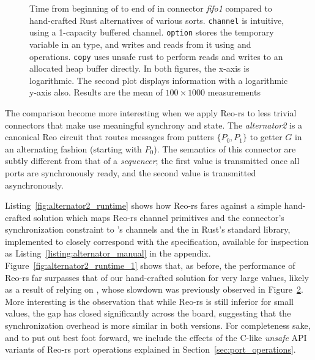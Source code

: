 \begin{figure}
{\begin{subfigure}[b]{0.63\textwidth}
			\caption{}
			\label{fig:exper_rtt_1}
		\end{subfigure}%
	}
	\caption[Performance of fifo1 connector vs.\ hand-crafted Rust code.]{Time from beginning of  to end of  in connector \textit{fifo1} compared to hand-crafted Rust alternatives of various sorts. \texttt{channel} is intuitive, using a  1-capacity buffered channel. \texttt{option} stores the temporary variable in an  type, and writes and reads from it using  and  operations. \texttt{copy} uses unsafe rust to perform reads and writes to an allocated heap buffer directly. In both figures, the x-axis is logarithmic. The second plot displays information with a logarithmic y-axis also. Results are the mean of $100\times{}1000$ measurements}
	\label{fig:exper_rtt}
\end{figure}

The comparison become more interesting when we apply Reo-rs to less trivial connectors that make use meaningful synchrony and state. The \textit{alternator2} is a canonical Reo circuit that routes messages from putters $\{P_0, P_1\}$ to getter $G$ in an alternating fashion (starting with $P_0$). The semantics of this connector are subtly different from that of a \textit{sequencer}; the first value is transmitted once all ports are synchronously ready, and the second value is transmitted asynchronously.

Listing~\ref{fig:alternator2_runtime} shows how Reo-rs fares against a simple hand-crafted solution which maps Reo-rs channel primitives and the connector's synchronization constraint to 's channels and the  in Rust's standard library, implemented to closely correspond with the specification, available for inspection as Listing~\ref{listing:alternator_manual} in the appendix. Figure~\ref{fig:alternator2_runtime_1} shows that, as before, the performance of Reo-rs far surpasses that of our hand-crafted solution for very large values, likely as a result of relying on , whose slowdown was previously observed in Figure~\ref{fig:exper_rtt}. More interesting is the observation that while Reo-rs is still inferior for small values, the gap has closed significantly across the board, suggesting that the synchronization overhead is more similar in both versions. For completeness sake, and to put out best foot forward, we include the effects of the C-like \textit{unsafe} API variants of Reo-rs port operations explained in Section~\ref{sec:port_operations}.  

